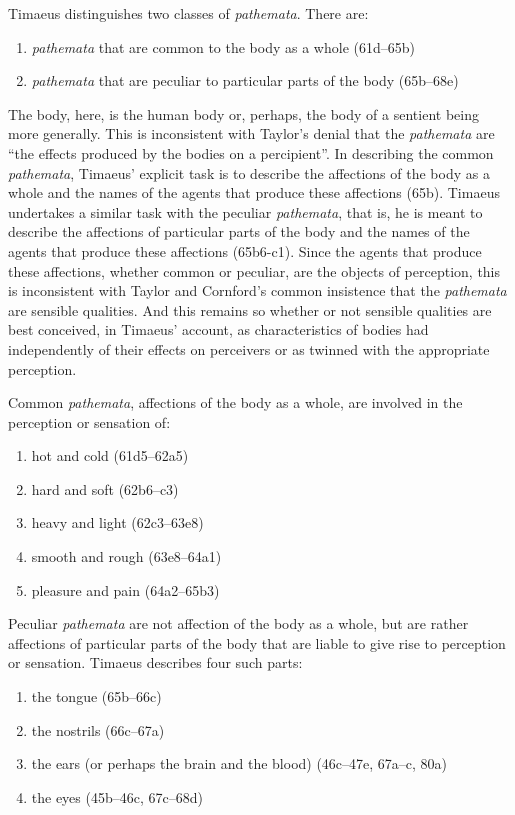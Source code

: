Timaeus distinguishes two classes of \emph{pathemata}. There are:
\begin{enumerate}
	\item \emph{pathemata} that are common to the body as a whole (61d--65b)
	\item \emph{pathemata} that are peculiar to particular parts of the body (65b--68e)
\end{enumerate}
The body, here, is the human body or, perhaps, the body of a sentient being more generally. This is inconsistent with Taylor's \citeyearpar[431]{Taylor:1928qb} denial that the \emph{pathemata} are ``the effects produced by the bodies on a percipient''. In describing the common \emph{pathemata}, Timaeus' explicit task is to describe the affections of the body as a whole and the names of the agents that produce these affections (65b). Timaeus undertakes a similar task with the peculiar \emph{pathemata}, that is, he is meant to describe the affections of particular parts of the body and the names of the agents that produce these affections (65b6-c1). Since the agents that produce these affections, whether common or peculiar, are the objects of perception, this is inconsistent with Taylor and Cornford's common insistence that the \emph{pathemata} are sensible qualities. And this remains so whether or not sensible qualities are best conceived, in Timaeus' account, as characteristics of bodies had independently of their effects on perceivers or as twinned with the appropriate perception. 

Common \emph{pathemata}, affections of the body as a whole, are involved in the perception or sensation of:
\begin{enumerate}
 	\item hot and cold (61d5--62a5)
 	\item hard and soft (62b6--c3)
 	\item heavy and light (62c3--63e8)
 	\item smooth and rough (63e8--64a1)
 	\item pleasure and pain (64a2--65b3)
\end{enumerate}

Peculiar \emph{pathemata} are not affection of the body as a whole, but are rather affections of particular parts of the body that are liable to give rise to perception or sensation. Timaeus describes four such parts:
\begin{enumerate}
	\item the tongue (65b--66c)
	\item the nostrils (66c--67a)
	\item the ears (or perhaps the brain and the blood) (46c--47e, 67a--c, 80a)
	\item the eyes (45b--46c, 67c--68d)
\end{enumerate}
	
